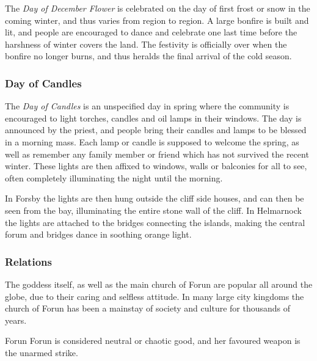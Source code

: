 The \emph{Day of December Flower} is celebrated on the day of first frost or
snow in the coming winter, and thus varies from region to region. A large
bonfire is built and lit, and people are encouraged to dance and celebrate one
last time before the harshness of winter covers the land. The festivity is
officially over when the bonfire no longer burns, and thus heralds the final
arrival of the cold season.

\subsubsection*{Day of Candles}

The \emph{Day of Candles} is an unspecified day in spring where the community
is encouraged to light torches, candles and oil lamps in their windows. The
day is announced by the priest, and people bring their candles and lamps to be
blessed in a morning mass. Each lamp or candle is supposed to welcome the
spring, as well as remember any family member or friend which has not survived
the recent winter. These lights are then affixed to windows, walls or balconies
for all to see, often completely illuminating the night until the morning.

In Forsby the lights are then hung outside the cliff side houses, and can
then be seen from the bay, illuminating the entire stone wall of the cliff. In
Helmarnock the lights are attached to the bridges connecting the islands,
making the central forum and bridges dance in soothing orange light.

\subsubsection*{Relations}

The goddess itself, as well as the main church of Forun are popular all around
the globe, due to their caring and selfless attitude. In many large city
kingdoms the church of Forun has been a mainstay of society and culture for
thousands of years.

\begin{35e}{Forun}
  Forun is considered neutral or chaotic good, and her favoured weapon is the
  unarmed strike.
\end{35e}
